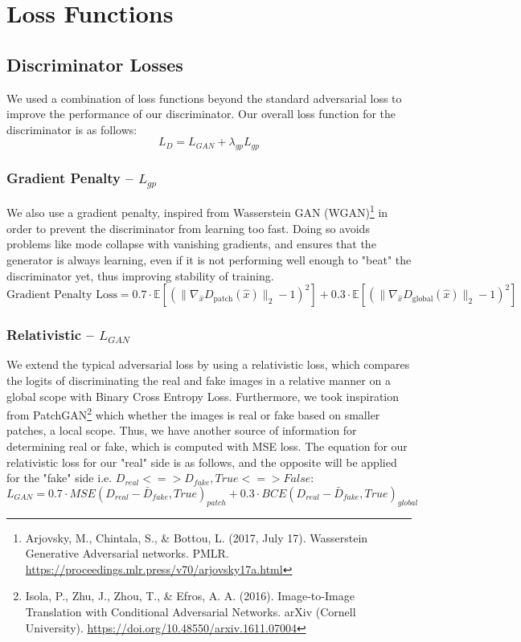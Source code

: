\documentclass[twoside,english,notitlepage]{report}
\begin{document}
\section{Loss Functions}\label{task1:losses}

\subsection{Discriminator Losses}
We used a combination of loss functions beyond the standard adversarial loss to improve the performance of our discriminator. Our overall loss function for the discriminator is as follows:
\begin{equation}
    L_{D} = L_{GAN} + \lambda_{gp} L_{gp}
\end{equation}

\subsubsection{Gradient Penalty – $L_{gp}$}
We also use a gradient penalty, inspired from Wasserstein GAN (WGAN)\footnote{Arjovsky, M., Chintala, S., \& Bottou, L. (2017, July 17). Wasserstein Generative Adversarial networks. PMLR. \href{https://proceedings.mlr.press/v70/arjovsky17a.html}{https://proceedings.mlr.press/v70/arjovsky17a.html}} in order to prevent the discriminator from learning too fast. Doing so avoids problems like mode collapse with vanishing gradients, and ensures that the generator is always learning, even if it is not performing well enough to "beat" the discriminator yet, thus improving stability of training.
\begin{equation*}
    \text{Gradient Penalty Loss} = 0.7 \cdot \mathbb{E} \left[ \left( \| \nabla_{\hat{x}} D_{\text{patch}} (\hat{x}) \|_2 - 1 \right)^2 \right] + 0.3 \cdot \mathbb{E} \left[ \left( \| \nabla_{\hat{x}} D_{\text{global}} (\hat{x}) \|_2 - 1 \right)^2 \right]
\end{equation*}

\subsubsection{Relativistic – $L_{GAN}$}
We extend the typical adversarial loss by using a relativistic loss, which compares the logits of discriminating the real and fake images in a relative manner on a global scope with Binary Cross Entropy Loss. Furthermore, we took inspiration from PatchGAN\footnote{Isola, P., Zhu, J., Zhou, T., \& Efros, A. A. (2016). Image-to-Image Translation with Conditional Adversarial Networks. arXiv (Cornell University). \href{https://doi.org/10.48550/arxiv.1611.07004}{https://doi.org/10.48550/arxiv.1611.07004}} which whether the images is real or fake based on smaller patches, a local scope. Thus, we have another source of information for determining real or fake, which is computed with MSE loss. The equation for our relativistic loss for our "real" side is as follows, and the opposite will be applied for the "fake" side i.e. $D_{real} <=> D_{fake}, True <=> False$:
\begin{equation}
    L_{GAN} = 0.7 \cdot MSE(D_{real} - \bar{D}_{fake}, True)_{patch} + 0.3 \cdot BCE(D_{real} - \bar{D}_{fake}, True)_{global}
\end{equation}
\end{document}

